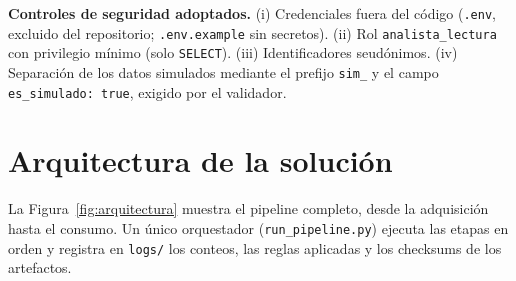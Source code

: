 \documentclass[11pt,a4paper]{article}
\begin{document}
\textbf{Controles de seguridad adoptados.} (i) Credenciales fuera del código (\texttt{.env}, excluido
del repositorio; \texttt{.env.example} sin secretos). (ii) Rol \texttt{analista\_lectura} con privilegio
mínimo (solo \texttt{SELECT}). (iii) Identificadores seudónimos. (iv) Separación de los datos simulados
mediante el prefijo \texttt{sim\_} y el campo \texttt{es\_simulado: true}, exigido por el validador.

\section{Arquitectura de la solución}
La Figura~\ref{fig:arquitectura} muestra el pipeline completo, desde la adquisición hasta el
consumo. Un único orquestador (\texttt{run\_pipeline.py}) ejecuta las etapas en orden y registra en
\texttt{logs/} los conteos, las reglas aplicadas y los checksums de los artefactos.
\end{document}
